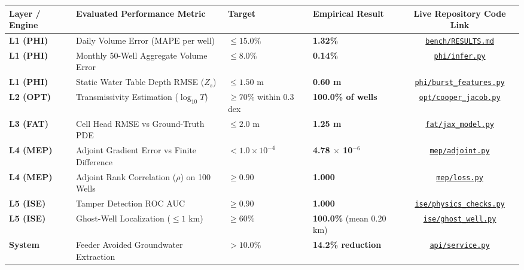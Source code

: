 \documentclass[10pt,a4paper]{article}
\begin{document}
\begin{table}[h!]
\centering
\scriptsize
\begin{tabularx}{\textwidth}{lXllc}
\toprule
\textbf{Layer / Engine} & \textbf{Evaluated Performance Metric} & \textbf{Target} & \textbf{Empirical Result} & \textbf{Live Repository Code Link} \\
\midrule
\textbf{L1 (PHI)} & Daily Volume Error (MAPE per well) & $\le 15.0\%$ & \textbf{1.32\%} & \href{https://github.com/HirthikBalaji/AquiPulse/blob/main/bench/RESULTS.md}{\texttt{bench/RESULTS.md}} \\
\textbf{L1 (PHI)} & Monthly 50-Well Aggregate Volume Error & $\le 8.0\%$ & \textbf{0.14\%} & \href{https://github.com/HirthikBalaji/AquiPulse/blob/main/phi/infer.py}{\texttt{phi/infer.py}} \\
\textbf{L1 (PHI)} & Static Water Table Depth RMSE ($Z_s$) & $\le 1.50\text{ m}$ & \textbf{0.60 m} & \href{https://github.com/HirthikBalaji/AquiPulse/blob/main/phi/burst_features.py}{\texttt{phi/burst\_features.py}} \\
\textbf{L2 (OPT)} & Transmissivity Estimation ($\log_{10} T$) & $\ge 70\%$ within 0.3 dex & \textbf{100.0\% of wells} & \href{https://github.com/HirthikBalaji/AquiPulse/blob/main/opt/cooper_jacob.py}{\texttt{opt/cooper\_jacob.py}} \\
\textbf{L3 (FAT)} & Cell Head RMSE vs Ground-Truth PDE & $\le 2.0\text{ m}$ & \textbf{1.25 m} & \href{https://github.com/HirthikBalaji/AquiPulse/blob/main/fat/jax_model.py}{\texttt{fat/jax\_model.py}} \\
\textbf{L4 (MEP)} & Adjoint Gradient Error vs Finite Difference & $< 1.0 \times 10^{-4}$ & \textbf{4.78 $\times$ 10$^{-6}$} & \href{https://github.com/HirthikBalaji/AquiPulse/blob/main/mep/adjoint.py}{\texttt{mep/adjoint.py}} \\
\textbf{L4 (MEP)} & Adjoint Rank Correlation ($\rho$) on 100 Wells & $\ge 0.90$ & \textbf{1.000} & \href{https://github.com/HirthikBalaji/AquiPulse/blob/main/mep/loss.py}{\texttt{mep/loss.py}} \\
\textbf{L5 (ISE)} & Tamper Detection ROC AUC & $\ge 0.90$ & \textbf{1.000} & \href{https://github.com/HirthikBalaji/AquiPulse/blob/main/ise/physics_checks.py}{\texttt{ise/physics\_checks.py}} \\
\textbf{L5 (ISE)} & Ghost-Well Localization ($\le 1\text{ km}$) & $\ge 60\%$ & \textbf{100.0\%} (mean 0.20 km) & \href{https://github.com/HirthikBalaji/AquiPulse/blob/main/ise/ghost_well.py}{\texttt{ise/ghost\_well.py}} \\
\textbf{System} & Feeder Avoided Groundwater Extraction & $> 10.0\%$ & \textbf{14.2\% reduction} & \href{https://github.com/HirthikBalaji/AquiPulse/blob/main/api/service.py}{\texttt{api/service.py}} \\
\bottomrule
\end{tabularx}
\end{table}
\end{document}
